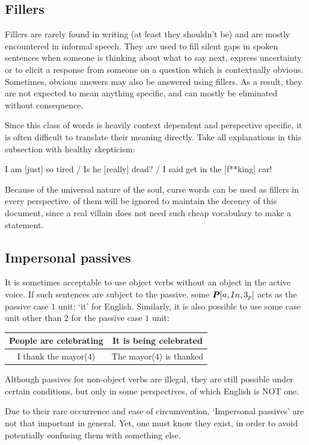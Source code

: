 \subsection{Fillers}
Fillers are rarely found in writing (at least they shouldn't be) and are mostly encountered in informal speech. They are used to fill silent gaps in spoken sentences when someone is thinking about what to say next, express uncertainty or to elicit a response from someone on a question which is contextually obvious. Sometimes, obvious answers may also be answered using fillers. As a result, they are not expected to mean anything specific, and can mostly be eliminated without consequence.

Since this class of words is heavily context dependent and perspective specific, it is often difficult to translate their meaning directly. Take all explanations in this subsection with healthy skepticism:
\begin{example}
        I am [just] so tired / Is he [really] dead? / I said get in the [f**king] car!
\end{example}
Because of the universal nature of the soul,  curse words can be used as fillers in every perspective.  of them will be ignored to maintain the decency of this document, since a real villain does not need such cheap vocabulary to make a statement.
\subsection{Impersonal passives}
It is sometimes acceptable to use object verbs without an object in the active voice. If such sentences are subject to the passive, some $\boldsymbol{P}[a,In,3_p]$ acts as the passive case $1$ unit:  `it' for English. Similarly, it is also possible to use some case unit other than $2$ for the passive case $1$ unit:
\begin{example}
    \begin{tabular}{c|c}
        People are celebrating & It is being celebrated\\\hline I thank the mayor($4$) & The mayor($4$) is thanked
    \end{tabular}
\end{example}
Although passives for non-object verbs are illegal, they are still possible under certain conditions, but only in some perspectives, of which English is NOT one.

Due to their rare occurrence and ease of circumvention, `Impersonal passives' are not that important in general. Yet, one must  know they exist, in order to avoid potentially confusing them with something else.
